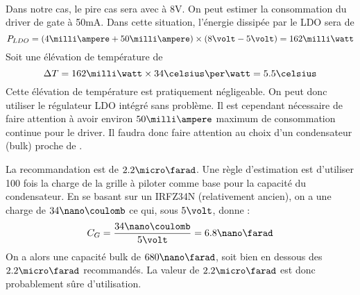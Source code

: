 \paragraph{}
Dans notre cas, le pire cas sera avec \vout{} à 8V.
On peut estimer la consommation du driver de gate à 50mA.
Dans cette situation, l'énergie dissipée par le LDO sera de 
$$P_{LDO} = (4\milli \ampere + 50 \milli \ampere ) \times (8 \volt - 5\volt) = 162 \milli\watt $$
Soit une élévation de température de 
$$\Delta T = 162 \milli \watt \times 34\celsius\per\watt = 5.5\celsius$$
Cette élévation de température est pratiquement négligeable.
On peut donc utiliser le régulateur LDO intégré sans problème.
Il est cependant nécessaire de faire attention à avoir environ $50\milli\ampere$ maximum de consommation continue pour le driver.
Il faudra donc faire attention au choix d'un condensateur (bulk) proche de \drvcc.

La recommandation est de $2.2\micro\farad$. 
Une règle d'estimation est d'utiliser 100 fois la charge de la grille à piloter comme base pour la capacité du condensateur.
En se basant sur un IRFZ34N (relativement ancien), on a une charge de $34\nano\coulomb$ ce qui, sous $5\volt$, donne :
$$C_G = \frac{34\nano\coulomb}{5\volt} = 6.8\nano\farad$$
On a alors une capacité bulk de $680\nano\farad$, soit bien en dessous des $2.2\micro\farad$ recommandés.
La valeur de $2.2\micro\farad$ est donc probablement sûre d'utilisation.

